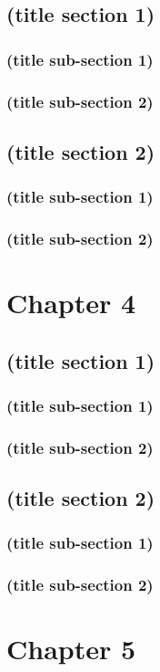 \section{(title section 1)}
\subsection{(title sub-section 1)}
\subsection{(title sub-section 2)}
\section{(title section 2)}
\subsection{(title sub-section 1)}
\subsection{(title sub-section 2)}
\chapter{Chapter 4}
\section{(title section 1)}
\subsection{(title sub-section 1)}
\subsection{(title sub-section 2)}
\section{(title section 2)}
\subsection{(title sub-section 1)}
\subsection{(title sub-section 2)}
\chapter{Chapter 5}
